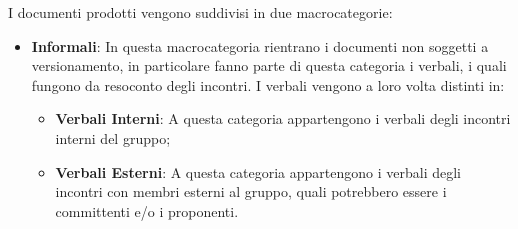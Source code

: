 I documenti prodotti vengono suddivisi in due macrocategorie:
\begin{itemize}
    \item \textbf{Informali}: In questa macrocategoria rientrano i documenti non soggetti a versionamento, in 
    particolare fanno parte di questa categoria i verbali, i quali fungono da resoconto degli incontri. I verbali 
    vengono a loro volta distinti in:
    \begin{itemize}
        \item \textbf{Verbali Interni}: A questa categoria appartengono i verbali degli incontri interni del gruppo;
        \item \textbf{Verbali Esterni}: A questa categoria appartengono i verbali degli incontri con membri esterni al 
        gruppo, quali potrebbero essere i committenti e/o i proponenti.
    \end{itemize}
    

\end{itemize}
